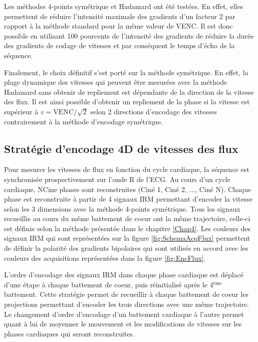 Les méthodes 4-points symétrique et Hadamard ont été testées. En effet, elles permettent de réduire l’intensité maximale des gradients d’un facteur 2 par rapport à la méthode standard pour la même valeur de VENC. Il est donc possible en utilisant 100 pourcents de l'intensité des gradients de réduire la durée des gradients de codage de vitesses et par conséquent le temps d’écho de la séquence.

Finalement, le choix définitif s'est porté sur la méthode symétrique. En effet, la plage dynamique des vitesses qui peuvent être mesurées avec la méthode Hadamard sans obtenir de repliement est dépendante de la direction de la vitesse des flux. Il est ainsi possible d'obtenir un repliement de la phase si la vitesse est supérieur à $v=\text{VENC}/\sqrt{2} $ selon 2 directions d'encodage des vitesses \cite{Pelc:1991aa} contrairement à la méthode d'encodage symétrique.

\subsection{Stratégie d'encodage 4D de vitesses des flux}

Pour mesurer les vitesses de flux en fonction du cycle cardiaque, la séquence est synchronisée prospectivement sur l’onde R de l'ECG. Au cours d'un cycle cardiaque, NCine phases sont reconstruites (Ciné 1, Ciné 2, ..., Ciné N). Chaque phase est reconstruite à partir de 4 signaux IRM permettant d'encoder la vitesse selon les 3 dimensions avec la méthode 4-points symétrique. Tous les signaux recueillis au cours du même battement de coeur ont la même trajectoire, celle-ci est définie selon la méthode présentée dans le chapitre \ref{Chap4}. Les couleurs des signaux IRM qui sont représentées sur la figure \ref{fig:SchemaAcqFlux} permettent de définir la polarité des gradients bipolaires qui sont utilisés en accord avec les couleurs des acquisitions représentées dans la figure \ref{fig:EncFlux}. 

L'ordre d'encodage des signaux IRM dans chaque phase cardiaque est déplacé d'une étape à chaque battement de coeur, puis réinitialisé après le 4$^\text{ème}$ battement. Cette stratégie permet de recueillir à chaque battement de coeur les projections permettant d'encoder les trois directions avec une même trajectoire. Le changement d'ordre d'encodage d'un battement cardiaque à l'autre permet quant à lui de moyenner le mouvement et les modifications de vitesses sur les phases cardiaques qui seront reconstruites.

